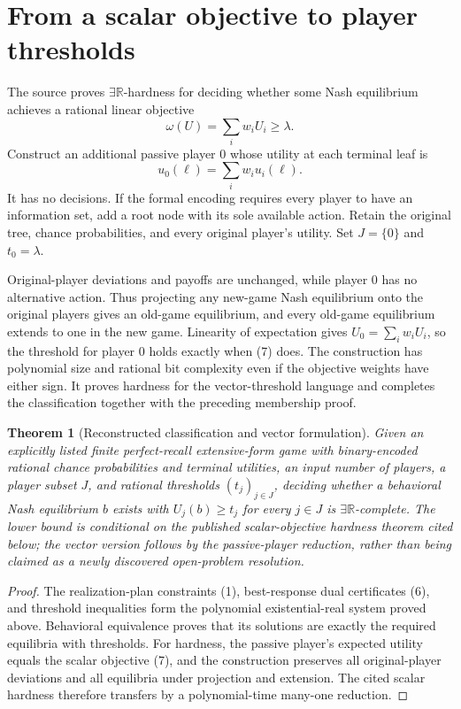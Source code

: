 \documentclass[11pt]{article}
\newtheorem{theorem}{Theorem}
\begin{document}
\section*{From a scalar objective to player thresholds}
The source proves $\exists\mathbb R$-hardness for deciding whether some
Nash equilibrium achieves a rational linear objective
\[
                    \omega(U)=\sum_i w_iU_i\geq\lambda.          \tag{7}
\]
Construct an additional passive player $0$ whose utility at each terminal
leaf is
\[
                              u_0(\ell)=\sum_iw_iu_i(\ell).
\]
It has no decisions. If the formal encoding requires every player to
have an information set, add a root node with its sole available action.
Retain the original tree, chance probabilities, and every original
player's utility. Set $J=\{0\}$ and $t_0=\lambda$.

Original-player deviations and payoffs are unchanged, while player $0$
has no alternative action. Thus projecting any new-game Nash equilibrium
onto the original players gives an old-game equilibrium, and every
old-game equilibrium extends to one in the new game. Linearity of
expectation gives $U_0=\sum_iw_iU_i$, so the threshold for player $0$
holds exactly when (7) does. The construction has polynomial size and
rational bit complexity even if the objective weights have either sign.
It proves hardness for the vector-threshold language and completes the
classification together with the preceding membership proof.

\begin{theorem}[Reconstructed classification and vector formulation]
Given an explicitly listed finite perfect-recall extensive-form game with
binary-encoded rational chance probabilities and terminal utilities,
an input number of players, a player subset $J$, and rational thresholds
$(t_j)_{j\in J}$, deciding whether a behavioral Nash equilibrium $b$
exists with $U_j(b)\geq t_j$ for every $j\in J$ is
$\exists\mathbb R$-complete. The lower bound is conditional on the
published scalar-objective hardness theorem cited below; the vector
version follows by the passive-player reduction, rather than being
claimed as a newly discovered open-problem resolution.
\end{theorem}
\begin{proof}
The realization-plan constraints (1), best-response dual certificates
(6), and threshold inequalities form the polynomial existential-real
system proved above. Behavioral equivalence proves that its solutions
are exactly the required equilibria with thresholds. For hardness, the
passive player's expected utility equals the scalar objective (7),
and the construction preserves all original-player deviations and all
equilibria under projection and extension. The cited scalar hardness
therefore transfers by a polynomial-time many-one reduction.
\end{proof}
\end{document}
